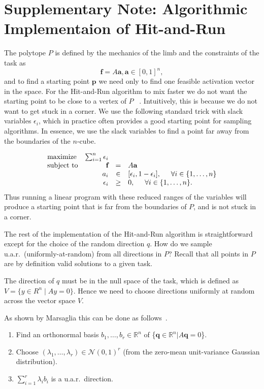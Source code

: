 \documentclass[letterpaper]{article}
\begin{document}
\section*{Supplementary Note: Algorithmic Implementaion of Hit-and-Run}
The polytope $P$ is defined by the mechanics of the limb and the constraints of the task as
\[\textbf{f} = A\textbf{a}, \textbf{a} \in [0,1]^n,\]
and to find a starting point $\textbf{p}$ we need only to find one feasible activation vector in the space.
For the Hit-and-Run algorithm to mix faster we do not want the starting point to be close to a vertex of $P$ ~\cite{Lovasz}. Intuitively, this is because we do not want to get stuck in a corner.
We use the following standard trick with slack variables $\epsilon_i$, which in practice often provides a good starting point for sampling algorithms. In essence, we use the slack variables to find a point far away from the boundaries of the $n$-cube.

\begin{equation}\label{eq:LP_r}
\begin{array}{lrcl}
\mbox{maximize} & \sum_{i=1}^n \epsilon_i \\
\mbox{subject to} & \textbf{f} &=& A\textbf{a}\\
 & a_i &\in& [\epsilon_i, 1- \epsilon_i], \hspace{5mm} \forall i \in \{1,\dots,n\} \\
 & \epsilon_i &\geq& 0, \hspace{5mm} \forall i \in \{1,\dots,n\}.
\end{array}
\end{equation}
Thus running a linear program with these reduced ranges of the variables will produce a starting point that is far from the boundaries of $P$, and is not stuck in a corner.



The rest of the implementation of the Hit-and-Run algorithm is straightforward except for the choice of the random direction $q$. How do we sample u.a.r.\ (uniformly-at-random) from all directions in $P$?
Recall that all points in $P$ are by definition valid solutions to a given task.

The direction of $q$ must be in the null space of the task, which is defined as $V = \{ y \in R^n \mid Ay = 0\}$. Hence we need to choose  directions uniformly at random across the vector space $V$.

As shown by Marsaglia this can be done as follows~\cite{Marsaglia}.
\begin{enumerate}
\item
Find an orthonormal basis $b_1, \dots, b_r \in \mathbb{R}^{n}$ of \{$\textbf{q} \in \mathbb{R}^n | A\textbf{q} = 0$\}.
\item
Choose $(\lambda_1, \dots, \lambda_r) \in \mathcal{N}(0,1)^r$ (from the zero-mean unit-variance Gaussian distribution).
\item
$\sum_{i=1}^r \lambda_i b_i$ is a u.a.r.\ direction.
\end{enumerate}
\end{document}
